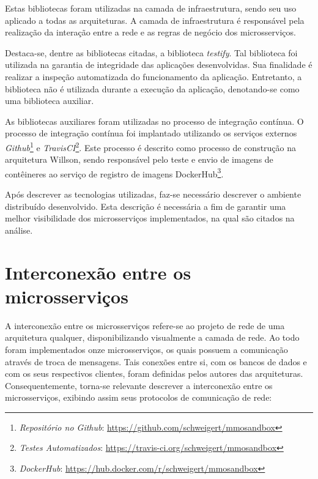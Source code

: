 Estas bibliotecas foram utilizadas na camada de infraestrutura, sendo seu uso aplicado a todas as arquiteturas.
%
A camada de infraestrutura é responsável pela realização da interação entre a rede e as regras de negócio dos microsserviços.


Destaca-se, dentre as bibliotecas citadas, a biblioteca \textit{testify}.
%
Tal biblioteca foi utilizada na garantia de integridade das aplicações desenvolvidas.
%
Sua finalidade é realizar a inspeção automatizada do funcionamento da aplicação.
%
Entretanto, a biblioteca não é utilizada durante a execução da aplicação, denotando-se como uma biblioteca auxiliar.



As bibliotecas auxiliares foram utilizadas no processo de integração contínua.
%
O processo de integração contínua foi implantado utilizando os serviços externos \textit{Github}\footnote{\textit{Repositório no Github}: \url{https://github.com/schweigert/mmosandbox}} e \textit{TravisCI}\footnote{\textit{Testes Automatizados}: \url{https://travis-ci.org/schweigert/mmosandbox}}.
%
Este processo é descrito como processo de construção na arquitetura Willson, sendo responsável pelo teste e envio de imagens de contêineres ao serviço de registro de imagens DockerHub\footnote{\textit{DockerHub}: \url{https://hub.docker.com/r/schweigert/mmosandbox}}.




Após descrever as tecnologias utilizadas, faz-se necessário descrever o ambiente distribuído desenvolvido.
%
Esta descrição é necessária a fim de garantir uma melhor visibilidade dos microsserviços implementados, na qual são citados na análise.



\section{Interconexão entre os microsserviços}
\label{sec:interconexao}



A interconexão entre os microsserviços refere-se ao projeto de rede de uma arquitetura qualquer, disponibilizando visualmente a camada de rede.
%
Ao todo foram implementados onze microsserviços, os quais possuem a comunicação através de troca de mensagens.
%
Tais conexões entre si, com os bancos de dados e com os seus respectivos clientes, foram definidas pelos autores das arquiteturas.
%
Consequentemente, torna-se relevante descrever a interconexão entre os microsserviços, exibindo assim seus protocolos de comunicação de rede:


